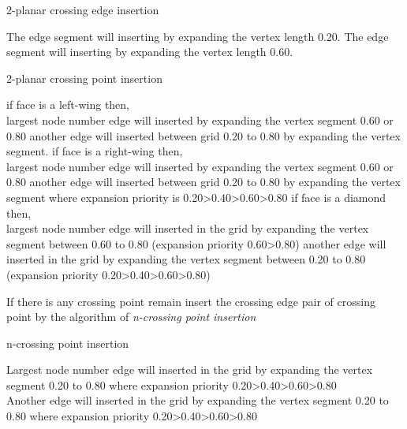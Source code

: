 \begin{algorithm}
\caption{2-planar crossing edge insertion}
\label{2pcei}
\begin{algorithmic}[1]

The edge segment will inserting by expanding the vertex length 0.20.
\ELSE
The edge segment will inserting by expanding the vertex length 0.60.
\ENDIF
\end{algorithmic}
\end{algorithm}


\begin{algorithm}
\caption{2-planar crossing point insertion}
\label{2pcpi}
\begin{algorithmic}[1]

\STATE if face is a left-wing then,\\

largest node number edge will inserted by expanding the vertex segment 0.60 or 0.80
another edge will inserted between grid 0.20 to 0.80 by expanding the vertex segment.
\STATE if face is a right-wing then,\\

largest node number edge will inserted by expanding the vertex segment 0.60 or 0.80
another edge will inserted between grid 0.20 to 0.80 by expanding the vertex segment where expansion priority is 0.20\textgreater 0.40\textgreater 0.60\textgreater 0.80
\STATE if face is a diamond then,\\
largest node number edge will inserted in the grid by expanding the vertex segment between 0.60 to 0.80 (expansion priority 0.60\textgreater 0.80)
another edge will inserted in the grid by expanding the vertex segment between 0.20 to 0.80  (expansion priority 0.20\textgreater 0.40\textgreater 0.60\textgreater 0.80)

\STATE If there is any crossing point remain insert the crossing edge pair of crossing point by the algorithm of \emph{n-crossing point insertion}

\end{algorithmic}
\end{algorithm}



\begin{algorithm}
\caption{n-crossing point insertion}
\label{ncpi}
\begin{algorithmic}[1]

\STATE Largest node number edge will inserted in the grid by expanding the vertex segment 0.20 to 0.80 where expansion priority 0.20\textgreater 0.40\textgreater 0.60\textgreater 0.80
\\
\STATE Another edge will inserted in the grid by expanding the vertex segment 0.20 to 0.80 where expansion priority 0.20\textgreater 0.40\textgreater 0.60\textgreater 0.80
\end{algorithmic}
\end{algorithm}



